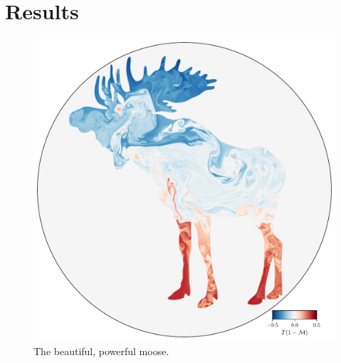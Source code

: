 \section{Results}
\label{sec:results}

\begin{figure}[hbtp]
\centering
    \includegraphics[width=\textwidth]{paper_figure02.pdf}
\caption{ The beautiful, powerful moose.
\label{fig:dynamics}
}
\end{figure}


